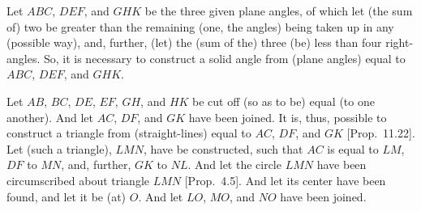 \epsfysize=1.1in
\centerline{}

Let $ABC$, $DEF$, and $GHK$ be the three given plane angles, of which let
(the sum of) two be greater than the remaining (one, the angles) being taken
up in any (possible way), and, further, (let) the (sum of the) three (be) less than
four right-angles. So, it is necessary to construct a solid angle from
(plane angles) equal to $ABC$, $DEF$, and $GHK$.

Let $AB$, $BC$, $DE$, $EF$, $GH$, and $HK$ be cut off (so as to be)
equal (to one another). And let $AC$, $DF$, and $GK$ have been joined.
It is, thus, possible to construct a triangle from (straight-lines) equal to
$AC$, $DF$, and $GK$ [Prop.~11.22]. Let
(such a triangle), $LMN$, have be constructed, such that $AC$ is equal to
$LM$, $DF$ to $MN$, and, further, $GK$ to $NL$. And let the circle
$LMN$ have been circumscribed about triangle $LMN$ [Prop.~4.5]. And let its center have been found, and let it be (at) $O$.
And let $LO$, $MO$, and $NO$ have been joined.

\centerline{}

